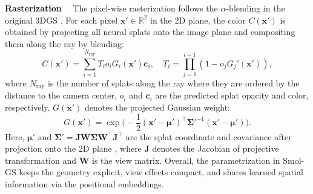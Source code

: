 \documentclass{article}
\def\vc{{\bm{c}}}
\def\vx{{\bm{x}}}
\def\mJ{{\bm{J}}}
\def\mW{{\bm{W}}}
\newcommand{\ours}{Smol-GS\xspace}
\renewcommand{\paragraph}[1]{\noindent\textbf{#1}~~}
\begin{document}
\paragraph{Rasterization} The pixel-wise rasterization follows the $\alpha$-blending in the original 3DGS \citep{kerbl20233dgs}. For each pixel $\vx'\in \mathbb{R}^2$ in the 2D plane, the color $C(\vx')$ is obtained by projecting all neural splats onto the image plane and compositing them along the ray by blending:
\begin{equation}\textstyle
  C(\vx') = \sum_{i=1}^{N_\text{ray}} T_i o_i G_i(\vx') \vc_i, \quad T_i = \prod_{j=1}^{i-1} (1 - o_jG_j'(\vx')),
\end{equation}
where $N_\text{ray}$ is the number of splats along the ray where they are ordered by the distance to the camera center, $o_i$ and $\vc_i$ are the predicted splat opacity and color, respectively. $G(\vx')$ denotes the projected Gaussian weight:
\begin{equation}\textstyle
  G(\vx') = \exp\big(-\frac{1}{2}(\vx' - \bm{\mu}')^\top \bm{\Sigma}'^{-1} (\vx' - \bm{\mu}')\big).
\end{equation}
Here, $\bm{\mu}'$ and $\bm{\Sigma}' = \mJ \mW \bm{\Sigma}  \mW^\top\mJ^\top$ are the splat coordinate and covariance after projection onto the 2D plane \cite{kopanas2021point,yifan2019differentiable}, 
%
%
where $\mJ$ denotes the Jacobian of projective transformation and $\mW$ is the view matrix. 
Overall, the parametrization in \ours keeps the geometry explicit, view effects compact, and shares learned spatial information via the positional embeddings.


%


%



%
%
%
%
%
%
%
%
%
%
%
%
%
%
\end{document}
